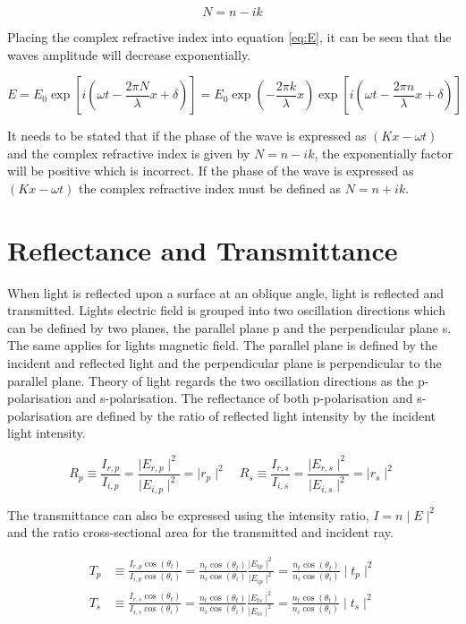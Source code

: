 \documentclass[MasterThesisMain.tex]{subfiles}
\begin{document}
\begin{equation}
N=n-ik
\end{equation}

Placing the complex refractive index into equation \ref{eq:E}, it can be seen that the waves amplitude will decrease exponentially.

\begin{equation}
E = E_0\exp[i(\omega t - \frac{2\pi N}{\lambda}x + \delta)] = E_0\exp(-\frac{2\pi k}{\lambda}x)\exp[i(\omega t - \frac{2\pi n}{\lambda}x + \delta)]
\end{equation}

It needs to be stated that if the phase of the wave is expressed as $(Kx-\omega t)$ and the complex refractive index is given by $N=n-ik$, the exponentially factor will be positive which is incorrect. If the phase of the wave is expressed as $(Kx-\omega t)$ the complex refractive index must be defined as $N=n+ik$.

\section{Reflectance and Transmittance}
When light is reflected upon a surface at an oblique angle, light is reflected and transmitted. Lights electric field is grouped into two oscillation directions which can be defined by two planes, the parallel plane p and the perpendicular plane s. The same applies for lights magnetic field. The parallel plane is defined by the incident and reflected light and the perpendicular plane is perpendicular to the parallel plane. Theory of light regards the two oscillation directions as the p-polarisation and s-polarisation. The reflectance of both p-polarisation and s-polarisation are defined by the ratio of reflected light intensity by the incident light intensity.

\begin{equation}
R_{p} \equiv \frac{I_{r,p}}{I_{i,p}} = \frac{\mid E_{r,p} \mid^2}{\mid E_{i,p} \mid^2} = \mid r_{p} \mid^2 \quad R_{s} \equiv \frac{I_{r,s}}{I_{i,s}} = \frac{\mid E_{r,s} \mid^2}{\mid E_{i,s} \mid^2} = \mid r_{s} \mid^2
\end{equation}

The transmittance can also be expressed using the intensity ratio, $I = n \mid E \mid^2$ and the ratio cross-sectional area for the transmitted and incident ray.

\begin{align}
T_p &\equiv \frac{I_{r,p}\cos(\theta_t)}{I_{i,p}\cos(\theta_i)} = \frac{n_t\cos(\theta_t)}{n_i\cos(\theta_i)}\frac{\mid E_{tp} \mid^2}{\mid E_{ip} \mid^2} = \frac{n_t\cos(\theta_t)}{n_i\cos(\theta_i)} \mid t_{p} \mid^2\\
T_s &\equiv \frac{I_{r,s}\cos(\theta_t)}{I_{i,s}\cos(\theta_i)} = \frac{n_t\cos(\theta_t)}{n_i\cos(\theta_i)}\frac{\mid E_{ts} \mid^2}{\mid E_{is} \mid^2} = \frac{n_t\cos(\theta_t)}{n_i\cos(\theta_i)} \mid t_{s} \mid^2\\
\end{align}
\end{document}
